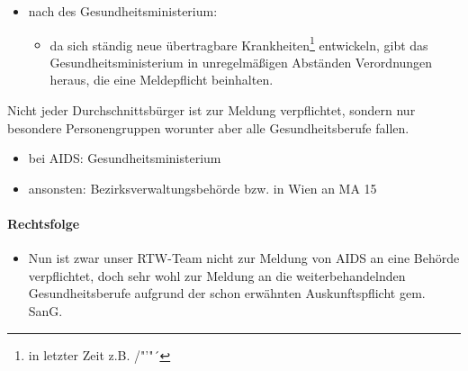 \begin{itemize}
\begin{itemize}
		\item {\mdseries
		es gibt keine Untersuchungs- oder Behandlungspflicht daher darf kein
		beh\"ordlicher Zwang ausge\"ubt werden}

	\end{itemize}

	\item {\mdseries
	nach  des Gesundheitsministerium:}

	\begin{itemize}
		\item {\mdseries
		da sich ständig neue \"ubertragbare
		Krankheiten\footnote{in letzter Zeit z.B.
		/"'"´} entwickeln, gibt das
		Gesundheitsministerium in unregelmä{\ss}igen Abständen Verordnungen heraus, die eine Meldepflicht beinhalten.}

	\end{itemize}
\end{itemize}


Nicht jeder Durchschnittsb\"urger ist zur Meldung verpflichtet, sondern
nur besondere Personengruppen worunter aber alle Gesundheitsberufe
fallen.


\begin{itemize}

	\item {\mdseries
	bei AIDS: Gesundheitsministerium}

	\item {\mdseries
	ansonsten: Bezirksverwaltungsbeh\"orde bzw. in Wien an MA 15}

\end{itemize}

\paragraph*{Rechtsfolge}

\begin{itemize}

	\item {\mdseries\color[rgb]{0.0,0.0,0.5019608}
	Nun ist zwar unser RTW-Team nicht zur Meldung von AIDS an eine Beh\"orde
	verpflichtet, doch sehr wohl zur Meldung an die weiterbehandelnden
	Gesundheitsberufe aufgrund der schon erwähnten Auskunftspflicht gem.
	 SanG.}

\end{itemize}

